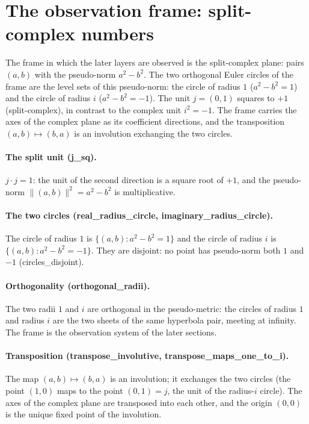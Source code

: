 \documentclass[sigplan,10pt,anonymous,review]{acmart}
\begin{document}
\section{The observation frame: split-complex numbers}

The frame in which the later layers are observed is the split-complex
plane: pairs $(a, b)$ with the pseudo-norm $a^2 - b^2$. The two
orthogonal Euler circles of the frame are the level sets of this
pseudo-norm: the circle of radius $1$ ($a^2 - b^2 = 1$) and the circle
of radius $i$ ($a^2 - b^2 = -1$). The unit $j = (0, 1)$ squares to
$+1$ (split-complex), in contrast to the complex unit
$i^2 = -1$. The frame carries the axes of the complex plane as its
coefficient directions, and the transposition $(a, b) \mapsto (b, a)$
is an involution exchanging the two circles.

\paragraph{The split unit (j\_sq).} $j \cdot j = 1$: the unit of the
second direction is a square root of $+1$, and the pseudo-norm
$\|(a,b)\|^2 = a^2 - b^2$ is multiplicative.

\paragraph{The two circles (real\_radius\_circle,
imaginary\_radius\_circle).} The circle of radius $1$ is
$\{(a,b) : a^2 - b^2 = 1\}$ and the circle of radius $i$ is
$\{(a,b) : a^2 - b^2 = -1\}$. They are disjoint: no point has
pseudo-norm both $1$ and $-1$ (circles\_disjoint).

\paragraph{Orthogonality (orthogonal\_radii).} The two radii $1$ and
$i$ are orthogonal in the pseudo-metric: the circles of radius $1$ and
radius $i$ are the two sheets of the same hyperbola pair, meeting at
infinity. The frame is the observation system of the later sections.

\paragraph{Transposition (transpose\_involutive,
transpose\_maps\_one\_to\_i).} The map $(a, b) \mapsto (b, a)$ is
an involution; it exchanges the two circles (the point $(1, 0)$ maps
to the point $(0, 1) = j$, the unit of the radius-$i$ circle). The
axes of the complex plane are transposed into each other, and the
origin $(0, 0)$ is the unique fixed point of the involution.
\end{document}
